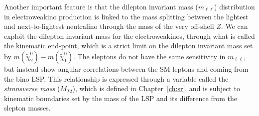 Another important feature is that the dilepton invariant mass ($m_{\ell\ell}$) distribution in electroweakino production is linked to the mass splitting between the lightest and next-to-lightest neutralino through the mass of the very off-shell $Z$.  We can exploit the dilepton invariant mass for the electroweakinos, through what is called the kinematic end-point, which is a strict limit on the dilepton invariant mass set by $m(\tilde\chi_2^0)-m(\tilde\chi_1^0)$. The sleptons do not have the same sensitivity in $m_{\ell\ell}$, but instead show angular correlations between the SM leptons and \met{} coming from the bino LSP.  This relationship is expressed through a variable called the \textit{stransverse mass} ($M_{T2}$), which is defined in Chapter~\ref{ch:sr}, and is subject to kinematic boundaries set by the mass of the LSP and its difference from the slepton masses.

 \iffalse
   \begin{figure}%
  \begin{center}
  \texttt{[image: /Users/sheenaschier/Documents/LaFiles/figures/thesis/theory/SEW\_mass\_spectra.png]}
   \end{center}
 \caption{Schematic of the mass spectrum among lightest electroweakinos, $\tilde\chi_1^0$, $\tilde\chi_1^\pm$, and $\tilde\chi_2^0$.}
 \label{fig:thy:mass}
 \end{figure}
 \fi
 \FloatBarrier

 
